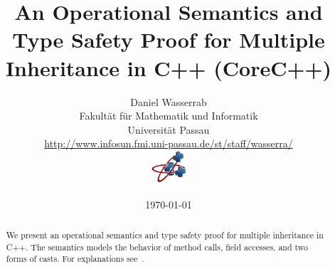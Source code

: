 \documentclass[11pt,a4paper]{article}
\begin{document}
\title{An Operational Semantics and Type Safety Proof for 
Multiple Inheritance in C++ (CoreC++)}

\author{Daniel Wasserrab\\
Fakult\"at f\"ur Mathematik und Informatik\\
Universit\"at Passau\\
\url{http://www.infosun.fmi.uni-passau.de/st/staff/wasserra/}\\
\includegraphics{corec++}}

\date{\today}
      
\maketitle

\begin{abstract}
We present an operational semantics and type safety proof for multiple
inheritance in C++. The semantics models the behavior of method calls, field
accesses, and two forms of casts.
For explanations see~\cite{WasserrabNST-OOPSLA06}.
\end{abstract}

\tableofcontents



\clearpage
{}
{}


\end{document}
